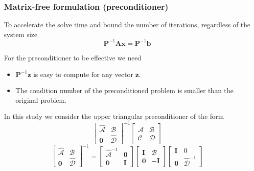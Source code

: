 \documentclass{beamer}
\newcommand{\bm}{\boldsymbol}
\begin{document}
\begin{frame}
	\frametitle{Matrix-free formulation (preconditioner)}
	To accelerate the solve time and bound the number of iterations, regardless of the system size
	\begin{equation}
		\boldsymbol{P}^{-1} \boldsymbol A \boldsymbol x = \boldsymbol{P}^{-1} \boldsymbol b \nonumber
	\end{equation}
	
	For the preconditioner to be effective we need
	\begin{itemize}
		\item $\boldsymbol P^{-1} \boldsymbol z $ is easy to compute for any vector $\boldsymbol z$.
		\item The condition number of the preconditioned problem is smaller than the original problem.
	\end{itemize}	

	In this study we consider the upper triangular preconditioner of the form
	$$
	\begin{bmatrix}
		\mathcal{\hat A} & \mathcal B \\
		\bm 0 & \mathcal{\hat D}
	\end{bmatrix}^{-1} \begin{bmatrix}
		\mathcal{A} & \mathcal B \\
		\mathcal C & \mathcal{D}
	\end{bmatrix}
	$$
	\begin{equation}\label{eq:schur-upper}
		\begin{bmatrix}
			\mathcal{\hat A} & \mathcal B \\
			\bm 0 & \mathcal{\hat D}
		\end{bmatrix}^{-1} = \begin{bmatrix}
			\mathcal{\hat{A}}^{-1} & \bm 0 \\
			\bm 0 & \bm I
		\end{bmatrix} \begin{bmatrix}
			\bm I & \mathcal{B} \\
			\bm 0 & -\bm I
		\end{bmatrix} \begin{bmatrix}
			\bm I & 0\\
			\bm 0 & \mathcal{\hat{D}}^{-1}
		\end{bmatrix} \nonumber
	\end{equation}
\end{frame}
\end{document}
